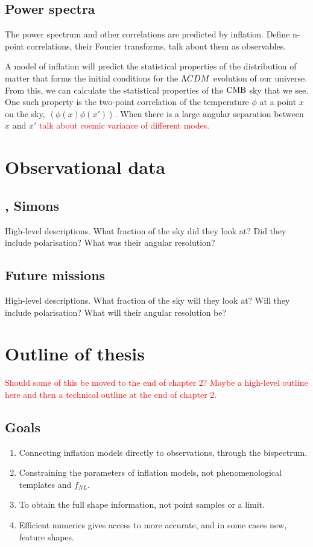     \subsection{Power spectra}
    The power spectrum and other correlations
    are predicted by inflation. 
    Define n-point correlations, their Fourier transforms, talk about them as observables.
    

    A model of inflation will predict the statistical properties of the distribution of matter
    that forms the initial conditions for the $\Lambda CDM$ evolution of our universe.
    From this, we can calculate the statistical properties of the $\text{CMB}$ sky that we see.
    One such property is the two-point correlation of the temperature $\phi$
    at a point $x$ on the sky, $\left<\phi(x)\phi(x')\right>$. When there is a large
    angular separation between $x$ and $x'$ \textcolor{red}{talk about cosmic variance
    of different modes.}
\newpage
\section{Observational data}
    \subsection{\planck, Simons} 
    High-level descriptions.
    What fraction of the sky did they look at?
    Did they include polarisation?
    What was their angular resolution?
\newpage
    \subsection{Future missions}
    High-level descriptions.
    What fraction of the sky will they look at?
    Will they include polarisation?
    What will their angular resolution be?
\newpage
\section{Outline of thesis}
\textcolor{red}{Should some of this be moved to the end of chapter 2? Maybe a high-level outline here
and then a technical outline at the end of chapter 2.}
    \subsection{Goals}
    \begin{enumerate}
        \item Connecting inflation models directly to observations,
            through the bispectrum.
        \item Constraining the parameters of inflation models, not phenomenological templates and $f_{NL}$.
        \item To obtain the full shape information, not point samples or a limit.
        \item Efficient numerics gives access to more accurate, and in some cases new, feature shapes.
    \end{enumerate}
\newpage
